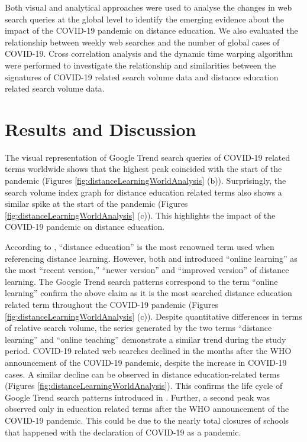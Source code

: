 \documentclass[11pt,a4paper,]{article}
\begin{document}
Both visual and analytical approaches were used to analyse the changes in web search queries at the global level to identify the emerging evidence about the impact of the COVID-19 pandemic on distance education. We also evaluated the relationship between weekly web searches and the number of global cases of COVID-19. Cross correlation analysis and the dynamic time warping algorithm \autocite{giorgino2009computing} were performed to investigate the relationship and similarities between the signatures of COVID-19 related search volume data and distance education related search volume data.

\hypertarget{results-and-discussion}{%
\section{Results and Discussion}\label{results-and-discussion}}

The visual representation of Google Trend search queries of COVID-19 related terms worldwide shows that the highest peak coincided with the start of the pandemic (Figures \ref{fig:distanceLearningWorldAnalysis} (b)). Surprisingly, the search volume index graph for distance education related terms also shows a similar spike at the start of the pandemic (Figures \ref{fig:distanceLearningWorldAnalysis} (c)). This highlights the impact of the COVID-19 pandemic on distance education.

According to \textcite{moore2011learning}, ``distance education'' is the most renowned term used when referencing distance learning. However, both \textcite{benson2002usability} and \textcite{conrad2002deep} introduced ``online learning'' as the most ``recent version,'' ``newer version'' and ``improved version'' of distance learning. The Google Trend search patterns correspond to the term ``online learning'' confirm the above claim as it is the most searched distance education related term throughout the COVID-19 pandemic (Figures \ref{fig:distanceLearningWorldAnalysis} (c)). Despite quantitative differences in terms of relative search volume, the series generated by the two terms ``distance learning'' and ``online teaching'' demonstrate a similar trend during the study period. COVID-19 related web searches declined in the months after the WHO announcement of the COVID-19 pandemic, despite the increase in COVID-19 cases. A similar decline can be observed in distance education-related terms (Figures \ref{fig:distanceLearningWorldAnalysis}). This confirms the life cycle of Google Trend search patterns introduced in \textcite{jarynowski2020perception}. Further, a second peak was observed only in education related terms after the WHO announcement of the COVID-19 pandemic. This could be due to the nearly total closures of schools that happened with the declaration of COVID-19 as a pandemic.
\end{document}
